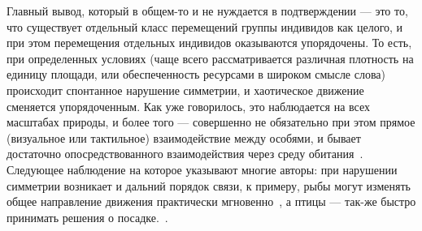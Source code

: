 	Главный вывод, который в общем-то и не нуждается в подтверждении --- это то, что существует отдельный класс перемещений группы индивидов как целого, и при этом перемещения отдельных индивидов оказываются упорядочены. То есть, при определенных условиях (чаще всего рассматривается различная плотность на единицу площади, или обеспеченность ресурсами в широком смысле слова) происходит спонтанное нарушение симметрии, и хаотическое движение сменяется упорядоченным. Как уже говорилось, это наблюдается на всех масштабах природы, и более того --- совершенно не обязательно при этом прямое (визуальное или тактильное) взаимодействие между особями, и бывает достаточно опосредствованного взаимодействия через среду обитания~\cite[с. 119]{vicsek2012}. %
	Следующее наблюдение на которое указывают многие авторы: при нарушении симметрии возникает и дальний порядок связи, к примеру, рыбы могут изменять общее направление движения практически мгновенно~\cite{cambui2012}, а птицы --- так-же быстро принимать решения о посадке.~\cite{lukeman2010,major1978}.

